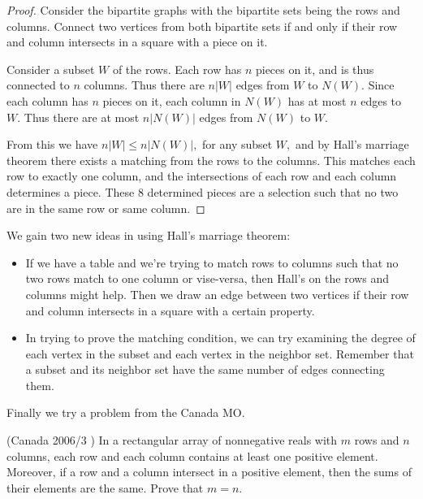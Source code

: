 \documentclass[11pt,paper=letter]{scrartcl}
\begin{document}
\begin{proof}
  Consider the bipartite graphs with the bipartite sets being the rows and columns. Connect two vertices from both bipartite sets if and only if their row and column intersects in a square with a piece on it.

  Consider a subset $W$ of the rows. Each row has $n$ pieces on it, and is thus connected to $n$ columns. Thus there are $n|W|$ edges from $W$ to $N(W).$ Since each column has $n$ pieces on it, each column in $N(W)$ has at most $n$ edges to $W.$ Thus there are at most $n|N(W)|$ edges from $N(W)$ to $W.$

  From this we have $n|W| \leq n|N(W)|,$ for any subset $W,$ and by Hall's marriage theorem there exists a matching from the rows to the columns. This matches each row to exactly one column, and the intersections of each row and each column determines a piece. These $8$ determined pieces are a selection such that no two are in the same row or same column.
\end{proof}

We gain two new ideas in using Hall's marriage theorem:

\begin{itemize}

\item If we have a table and we're trying to match rows to columns such that no two rows match to one column or vise-versa, then Hall's on the rows and columns might help. Then we draw an edge between two vertices if their row and column intersects in a square with a certain property.

\item In trying to prove the matching condition, we can try examining the degree of each vertex in the subset and each vertex in the neighbor set. Remember that a subset and its neighbor set have the same number of edges connecting them.

\end{itemize}

Finally we try a problem from the Canada MO.

\begin{problem}
  (Canada 2006/3 \cite{canada}) In a rectangular array of nonnegative reals with $m$ rows and $n$ columns, each row and each column contains at least one positive element. Moreover, if a row and a column intersect in a positive element, then the sums of their elements are the same. Prove that $m = n$.
\end{problem}
\end{document}
